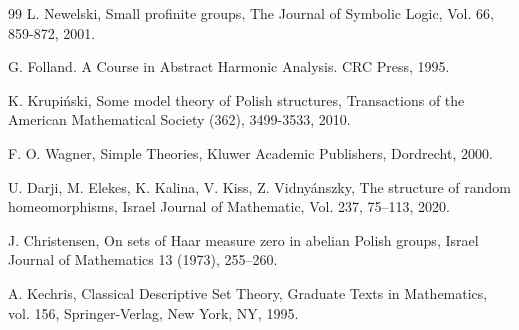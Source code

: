\documentclass{article}
\begin{document}
\begin{thebibliography}{99}
 L. Newelski, Small profinite groups, The Journal of Symbolic Logic, Vol. 66, 859-872,  2001. 

G. Folland. A Course in Abstract Harmonic Analysis. CRC Press, 1995.

K. Krupi\'{n}ski, Some model theory of Polish structures, Transactions of the American Mathematical Society (362), 3499-3533, 2010.

F. O. Wagner, Simple Theories, Kluwer Academic Publishers, Dordrecht, 2000. 

 U. Darji, M. Elekes, K. Kalina, V. Kiss, Z. Vidny\'{a}nszky,  The structure of random homeomorphisms,  Israel Journal of Mathematic, Vol. 237, 75–113, 2020.

 J. Christensen, On sets of Haar measure zero in abelian Polish groups, Israel Journal of Mathematics 13 (1973), 255–260.

 A. Kechris, Classical Descriptive Set Theory, Graduate Texts in Mathematics, vol. 156, Springer-Verlag, New York, NY, 1995.
\end{thebibliography}
\end{document}
